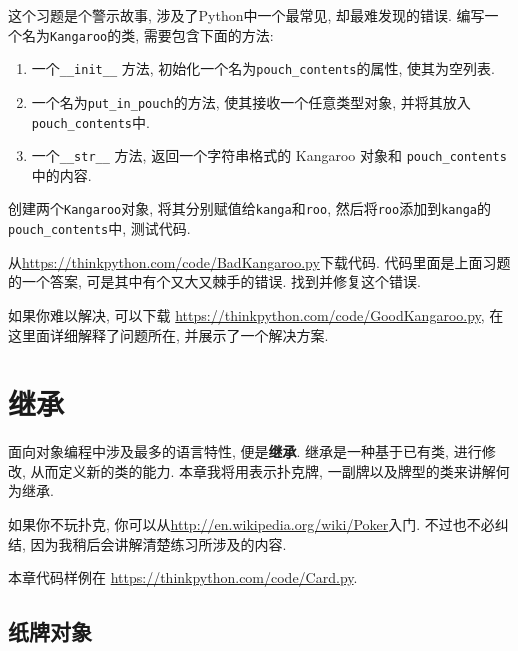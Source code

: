 \documentclass[10pt]{book}
\begin{document}
\begin{exercise}
\label{kangaroo}

这个习题是个警示故事, 涉及了Python中一个最常见, 却最难发现的错误. 
编写一个名为{\tt Kangaroo}的类, 需要包含下面的方法:

\begin{enumerate}

\item 一个\verb"__init__" 方法, 初始化一个名为\verb"pouch_contents"的属性, 
使其为空列表. 

\item 一个名为\verb"put_in_pouch"的方法, 使其接收一个任意类型对象, 并将其放入
\verb"pouch_contents"中. 

\item 一个\verb"__str__" 方法, 返回一个字符串格式的 Kangaroo 对象和 \verb"pouch_contents" 中的内容. 

\end{enumerate}
%
创建两个{\tt Kangaroo}对象, 将其分别赋值给{\tt kanga}和{\tt roo}, 
然后将{\tt roo}添加到{\tt kanga}的\verb"pouch_contents"中, 测试代码. 

从\url{https://thinkpython.com/code/BadKangaroo.py}下载代码. 
代码里面是上面习题的一个答案, 
可是其中有个又大又棘手的错误. 找到并修复这个错误. 

如果你难以解决, 可以下载
\url{https://thinkpython.com/code/GoodKangaroo.py}, 
在这里面详细解释了问题所在, 并展示了一个解决方案. 

\end{exercise}


\chapter{继承}

面向对象编程中涉及最多的语言特性, 便是{\bf 继承}. 
继承是一种基于已有类, 进行修改, 从而定义新的类的能力. 
本章我将用表示扑克牌, 一副牌以及牌型的类来讲解何为继承. 

如果你不玩扑克, 你可以从\url{http://en.wikipedia.org/wiki/Poker}入门. 
不过也不必纠结, 因为我稍后会讲解清楚练习所涉及的内容. 

本章代码样例在
\url{https://thinkpython.com/code/Card.py}.


\section{纸牌对象}
\end{document}
